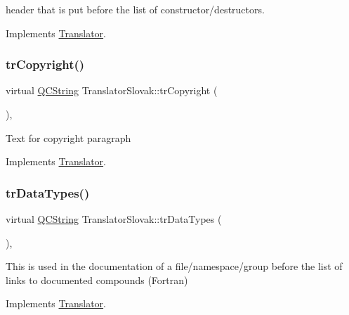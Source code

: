 header that is put before the list of constructor/destructors. 

Implements \mbox{\hyperlink{class_translator}{Translator}}.

\mbox{\label{class_translator_slovak_a0768be46a7597885e722b8fc278e5cb0}} 
\subsubsection{\texorpdfstring{trCopyright()}{trCopyright()}}
{\footnotesize\ttfamily virtual \mbox{\hyperlink{class_q_c_string}{Q\+C\+String}} Translator\+Slovak\+::tr\+Copyright (\begin{DoxyParamCaption}{ }\end{DoxyParamCaption})\hspace{0.3cm}{\ttfamily [inline]}, {\ttfamily [virtual]}}

Text for copyright paragraph 

Implements \mbox{\hyperlink{class_translator}{Translator}}.

\mbox{\label{class_translator_slovak_a1fb2ce2c34dafe725c49f64870175f9c}} 
\subsubsection{\texorpdfstring{trDataTypes()}{trDataTypes()}}
{\footnotesize\ttfamily virtual \mbox{\hyperlink{class_q_c_string}{Q\+C\+String}} Translator\+Slovak\+::tr\+Data\+Types (\begin{DoxyParamCaption}{ }\end{DoxyParamCaption})\hspace{0.3cm}{\ttfamily [inline]}, {\ttfamily [virtual]}}

This is used in the documentation of a file/namespace/group before the list of links to documented compounds (Fortran) 

Implements \mbox{\hyperlink{class_translator}{Translator}}.

\mbox{\label{class_translator_slovak_a46a3917b2e54965f0e4d768e9187b4e2}} 

